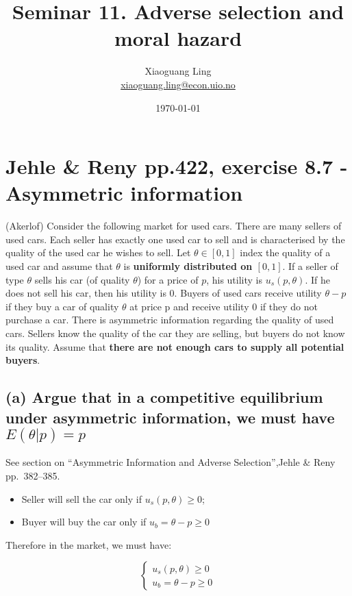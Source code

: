 \documentclass{article}
\title{Seminar 11. Adverse selection and moral hazard}
\author{Xiaoguang Ling \\  \href{xiaoguang.ling@econ.uio.no}{xiaoguang.ling@econ.uio.no}}
\date{\today}
\begin{document}
\maketitle


\section{Jehle \& Reny pp.422, exercise 8.7 - Asymmetric information}

(Akerlof) Consider the following market for used cars. There are many sellers of used cars. Each
seller has exactly one used car to sell and is characterised by the quality of the used car he wishes to
sell. Let $\theta \in [0, 1]$ index the quality of a used car and assume that $\theta$ is \textbf{uniformly distributed on $[0, 1]$}.
If a seller of type $\theta$ sells his car (of quality $\theta$) for a price of $p$, his utility is $u_s(p, \theta)$. If he does not sell
his car, then his utility is 0. Buyers of used cars receive utility $\theta - p$ if they buy a car of quality $\theta$ at
price p and receive utility 0 if they do not purchase a car. There is asymmetric information regarding
the quality of used cars. Sellers know the quality of the car they are selling, but buyers do not know
its quality. Assume that \textbf{there are not enough cars to supply all potential buyers}.


\subsection*{(a) Argue that in a competitive equilibrium under asymmetric information, we must have
$E(\theta | p) = p$}
\begin{mdframed}[backgroundcolor=blue!20,linecolor=white]
See section on ``Asymmetric Information and Adverse Selection'',Jehle \& Reny pp.~382--385.
\end{mdframed}

\begin{itemize}
\item Seller will sell the car only if $u_s(p, \theta) \ge 0$;
\item Buyer will buy the car only if $u_b =\theta - p \ge 0$
\end{itemize}

Therefore in the market, we must have:

\begin{equation}
    \begin{cases}
u_s(p, \theta) \ge 0 \\
u_b = \theta - p \ge 0
    \end{cases}
\nonumber
\end{equation}
\end{document}
